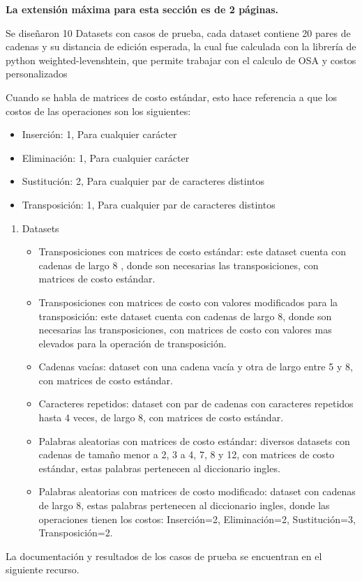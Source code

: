 \begin{mdframed}
    \textbf{La extensión máxima para esta sección es de 2 páginas.}
\end{mdframed}

Se diseñaron 10 Datasets con casos de prueba, cada dataset contiene 20
pares de cadenas y su distancia de edición esperada, la cual fue calculada
con la librería de python weighted-levenshtein, que permite trabajar con 
el calculo de OSA y costos personalizados

\begin{mdframed}
    Cuando se habla de matrices de costo estándar, esto hace referencia a que 
    los costos de las operaciones son los siguientes:
    \begin{itemize}
        \item Inserción: 1, Para cualquier carácter
        \item Eliminación: 1, Para cualquier carácter
        \item Sustitución: 2, Para cualquier par de caracteres distintos
        \item Transposición: 1, Para cualquier par de caracteres distintos 
    \end{itemize}
\end{mdframed}    

\begin{enumerate}
    \item Datasets
        \begin{itemize}
            \item Transposiciones con matrices de costo estándar: este dataset cuenta con cadenas de largo 8
            , donde son necesarias las transposiciones, con matrices
            de costo estándar.
            \item Transposiciones con matrices de costo con valores modificados para la transposición: este
            dataset cuenta con cadenas de largo 8, donde son necesarias las transposiciones,
            con matrices de costo con valores mas elevados para la operación de transposición.
            \item Cadenas vacías: dataset con una cadena vacía y otra de largo entre 5 y 8, con
            matrices de costo estándar.
            \item Caracteres repetidos: dataset con par de cadenas con caracteres repetidos
            hasta 4 veces, de largo 8, con matrices de costo estándar.
            \item Palabras aleatorias con matrices de costo estándar: diversos datasets con cadenas de tamaño
                menor a 2, 3 a 4, 7, 8 y 12, con matrices de costo estándar, estas palabras pertenecen
                al diccionario ingles.
            
            \item Palabras aleatorias con matrices de costo modificado: dataset con
            cadenas de largo 8, estas palabras pertenecen
            al diccionario ingles, donde las operaciones tienen los costos: Inserción=2,
            Eliminación=2, Sustitución=3, Transposición=2.
        \end{itemize}

\end{enumerate}

La documentación y resultados de los casos de prueba se encuentran en el siguiente recurso.

\vfill